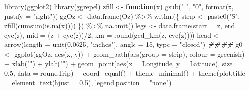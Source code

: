 \documentclass[
]{article}
\newenvironment{Shaded}{\begin{snugshade}}{\end{snugshade}}
\newcommand{\AttributeTok}[1]{\textcolor[rgb]{0.77,0.63,0.00}{#1}}
\newcommand{\ControlFlowTok}[1]{\textcolor[rgb]{0.13,0.29,0.53}{\textbf{#1}}}
\newcommand{\DecValTok}[1]{\textcolor[rgb]{0.00,0.00,0.81}{#1}}
\newcommand{\DocumentationTok}[1]{\textcolor[rgb]{0.56,0.35,0.01}{\textbf{\textit{#1}}}}
\newcommand{\FloatTok}[1]{\textcolor[rgb]{0.00,0.00,0.81}{#1}}
\newcommand{\FunctionTok}[1]{\textcolor[rgb]{0.00,0.00,0.00}{#1}}
\newcommand{\NormalTok}[1]{#1}
\newcommand{\OtherTok}[1]{\textcolor[rgb]{0.56,0.35,0.01}{#1}}
\newcommand{\SpecialCharTok}[1]{\textcolor[rgb]{0.00,0.00,0.00}{#1}}
\newcommand{\StringTok}[1]{\textcolor[rgb]{0.31,0.60,0.02}{#1}}
\begin{document}
\begin{Shaded}
\begin{Highlighting}[]
\FunctionTok{library}\NormalTok{(ggplot2)}
\FunctionTok{library}\NormalTok{(ggrepel)}
\NormalTok{zfill }\OtherTok{\textless{}{-}} \ControlFlowTok{function}\NormalTok{(x) }\FunctionTok{gsub}\NormalTok{(}\StringTok{" "}\NormalTok{, }\StringTok{"0"}\NormalTok{, }\FunctionTok{format}\NormalTok{(x, }\AttributeTok{justify =} \StringTok{"right"}\NormalTok{))}
\NormalTok{ggOz }\OtherTok{\textless{}{-}} \FunctionTok{data.frame}\NormalTok{(Oz) }\SpecialCharTok{\%\textgreater{}\%} \FunctionTok{within}\NormalTok{(\{}
\NormalTok{  strip }\OtherTok{\textless{}{-}} \FunctionTok{paste0}\NormalTok{(}\StringTok{"S"}\NormalTok{, }\FunctionTok{zfill}\NormalTok{(}\FunctionTok{cumsum}\NormalTok{(}\FunctionTok{is.na}\NormalTok{(x))))}
\NormalTok{\}) }\SpecialCharTok{\%\textgreater{}\%} \FunctionTok{na.omit}\NormalTok{()}
\NormalTok{legs }\OtherTok{\textless{}{-}} \FunctionTok{data.frame}\NormalTok{(}\AttributeTok{start =}\NormalTok{ z, }\AttributeTok{end =} \FunctionTok{cyc}\NormalTok{(z), }\AttributeTok{mid =}\NormalTok{ (z }\SpecialCharTok{+} \FunctionTok{cyc}\NormalTok{(z))}\SpecialCharTok{/}\DecValTok{2}\NormalTok{, }
                   \AttributeTok{km =} \FunctionTok{round}\NormalTok{(}\FunctionTok{gcd\_km}\NormalTok{(z, }\FunctionTok{cyc}\NormalTok{(z))))}
\NormalTok{head }\OtherTok{\textless{}{-}} \FunctionTok{arrow}\NormalTok{(}\AttributeTok{length =} \FunctionTok{unit}\NormalTok{(}\FloatTok{0.0625}\NormalTok{, }\StringTok{"inches"}\NormalTok{), }\AttributeTok{angle =} \DecValTok{15}\NormalTok{, }\AttributeTok{type =} \StringTok{"closed"}\NormalTok{)}
\DocumentationTok{\#\#\#\#}
\NormalTok{g0 }\OtherTok{\textless{}{-}} \FunctionTok{ggplot}\NormalTok{(ggOz, }\FunctionTok{aes}\NormalTok{(x, y)) }\SpecialCharTok{+} 
  \FunctionTok{geom\_path}\NormalTok{(}\FunctionTok{aes}\NormalTok{(}\AttributeTok{group =}\NormalTok{ strip), }\AttributeTok{colour =}\NormalTok{ greenish) }\SpecialCharTok{+} \FunctionTok{xlab}\NormalTok{(}\StringTok{""}\NormalTok{) }\SpecialCharTok{+} \FunctionTok{ylab}\NormalTok{(}\StringTok{""}\NormalTok{) }\SpecialCharTok{+} 
  \FunctionTok{geom\_point}\NormalTok{(}\FunctionTok{aes}\NormalTok{(}\AttributeTok{x =}\NormalTok{ Longitude, }\AttributeTok{y =}\NormalTok{ Latitude), }\AttributeTok{size =} \FloatTok{0.5}\NormalTok{,}
             \AttributeTok{data =}\NormalTok{ roundTrip) }\SpecialCharTok{+} \FunctionTok{coord\_equal}\NormalTok{() }\SpecialCharTok{+} \FunctionTok{theme\_minimal}\NormalTok{() }\SpecialCharTok{+} 
  \FunctionTok{theme}\NormalTok{(}\AttributeTok{plot.title =} \FunctionTok{element\_text}\NormalTok{(}\AttributeTok{hjust =} \FloatTok{0.5}\NormalTok{), }\AttributeTok{legend.position =} \StringTok{"none"}\NormalTok{)}

\end{Highlighting}
\end{Shaded}
\end{document}
